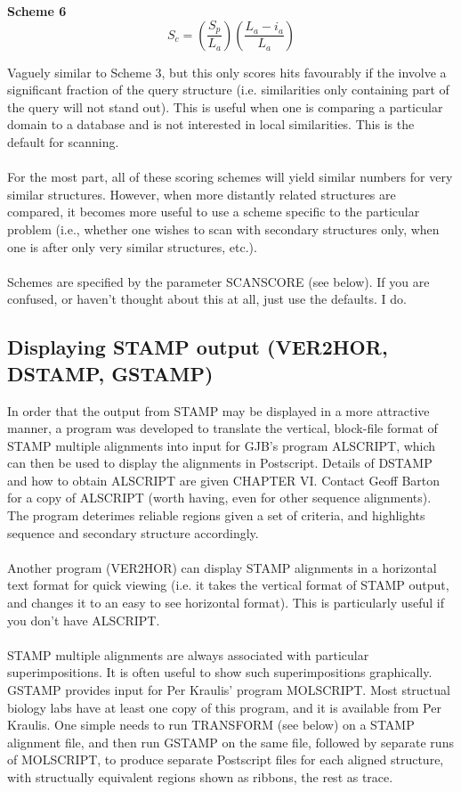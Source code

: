 {\bf Scheme 6}
\[
S_{c} =
\left(
\frac{S_{p}}{L_{a}}
\right)
\left(
\frac{L_{a}-i_{a}}{L_{a}}
\right)
\]

Vaguely similar to Scheme 3, but this only scores hits favourably
if the involve a significant fraction of the query structure
(i.e. similarities only containing part of the query will not
stand out).  This is useful when one is comparing a particular
domain to a database and is not interested in local similarities.
This is the default for scanning.\\
\\
For the most part, all of these scoring schemes will yield similar
numbers for very similar structures.  However, when more distantly
related structures are compared, it becomes more useful to use a
scheme specific to the particular problem (i.e., whether one wishes
to scan with secondary structures only, when one is after only
very similar structures, etc.).\\
\\
Schemes are specified by the parameter SCANSCORE (see below).  If 
you are confused, or haven't thought about this at all, just use the 
defaults.  I do.

\subsection{Displaying STAMP output (VER2HOR, DSTAMP, GSTAMP)}

In order that the output from STAMP may be displayed in a more 
attractive manner, a program was developed to translate the
vertical, block-file format of STAMP multiple alignments into input
for GJB's program ALSCRIPT, which can then be used to display the
alignments in Postscript.  Details of DSTAMP and how to obtain
ALSCRIPT are given CHAPTER VI.  Contact Geoff Barton for a copy of
ALSCRIPT (worth having, even for other sequence alignments).
The program deterimes reliable regions given a set of criteria, and
highlights sequence and secondary structure accordingly.\\
\\
Another program (VER2HOR) can display STAMP alignments in a horizontal text
format for quick viewing (i.e. it takes the vertical format of STAMP output, and
changes it to an easy to see horizontal format).
This is particularly useful if you don't have ALSCRIPT.\\
\\
STAMP multiple alignments are always associated with particular
superimpositions.  It is often useful to show such superimpositions
graphically.  GSTAMP provides input for Per
Kraulis' program MOLSCRIPT.  Most structual biology labs have at
least one copy of this program, and it is available from Per
Kraulis.  One simple needs to run TRANSFORM (see below) on a STAMP
alignment file, and then run GSTAMP on the same file, followed by
separate runs of MOLSCRIPT, to produce separate Postscript files
for each aligned structure, with structually equivalent regions
shown as ribbons, the rest as \Cal trace.


